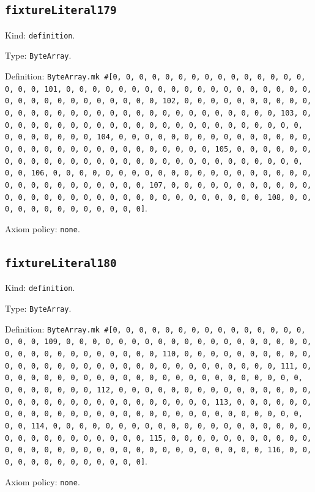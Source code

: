 \documentclass[11pt]{article}
\begin{document}
\subsection*{\texttt{fixtureLiteral179}}
\noindent Kind: \texttt{definition}.\par
\noindent Type: \texttt{ByteArray}.\par
\noindent Definition: \texttt{ByteArray.mk \#[0, 0, 0, 0, 0, 0, 0, 0, 0, 0, 0, 0, 0, 0, 0, 0, 0, 0, 101, 0, 0, 0, 0, 0, 0, 0, 0, 0, 0, 0, 0, 0, 0, 0, 0, 0, 0, 0, 0, 0, 0, 0, 0, 0, 0, 0, 0, 0, 0, 0, 102, 0, 0, 0, 0, 0, 0, 0, 0, 0, 0, 0, 0, 0, 0, 0, 0, 0, 0, 0, 0, 0, 0, 0, 0, 0, 0, 0, 0, 0, 0, 0, 103, 0, 0, 0, 0, 0, 0, 0, 0, 0, 0, 0, 0, 0, 0, 0, 0, 0, 0, 0, 0, 0, 0, 0, 0, 0, 0, 0, 0, 0, 0, 0, 104, 0, 0, 0, 0, 0, 0, 0, 0, 0, 0, 0, 0, 0, 0, 0, 0, 0, 0, 0, 0, 0, 0, 0, 0, 0, 0, 0, 0, 0, 0, 0, 105, 0, 0, 0, 0, 0, 0, 0, 0, 0, 0, 0, 0, 0, 0, 0, 0, 0, 0, 0, 0, 0, 0, 0, 0, 0, 0, 0, 0, 0, 0, 0, 106, 0, 0, 0, 0, 0, 0, 0, 0, 0, 0, 0, 0, 0, 0, 0, 0, 0, 0, 0, 0, 0, 0, 0, 0, 0, 0, 0, 0, 0, 0, 0, 107, 0, 0, 0, 0, 0, 0, 0, 0, 0, 0, 0, 0, 0, 0, 0, 0, 0, 0, 0, 0, 0, 0, 0, 0, 0, 0, 0, 0, 0, 0, 0, 108, 0, 0, 0, 0, 0, 0, 0, 0, 0, 0, 0, 0, 0]}.\par
\noindent Axiom policy: \texttt{none}.\par
\subsection*{\texttt{fixtureLiteral180}}
\noindent Kind: \texttt{definition}.\par
\noindent Type: \texttt{ByteArray}.\par
\noindent Definition: \texttt{ByteArray.mk \#[0, 0, 0, 0, 0, 0, 0, 0, 0, 0, 0, 0, 0, 0, 0, 0, 0, 0, 109, 0, 0, 0, 0, 0, 0, 0, 0, 0, 0, 0, 0, 0, 0, 0, 0, 0, 0, 0, 0, 0, 0, 0, 0, 0, 0, 0, 0, 0, 0, 0, 110, 0, 0, 0, 0, 0, 0, 0, 0, 0, 0, 0, 0, 0, 0, 0, 0, 0, 0, 0, 0, 0, 0, 0, 0, 0, 0, 0, 0, 0, 0, 0, 111, 0, 0, 0, 0, 0, 0, 0, 0, 0, 0, 0, 0, 0, 0, 0, 0, 0, 0, 0, 0, 0, 0, 0, 0, 0, 0, 0, 0, 0, 0, 0, 112, 0, 0, 0, 0, 0, 0, 0, 0, 0, 0, 0, 0, 0, 0, 0, 0, 0, 0, 0, 0, 0, 0, 0, 0, 0, 0, 0, 0, 0, 0, 0, 113, 0, 0, 0, 0, 0, 0, 0, 0, 0, 0, 0, 0, 0, 0, 0, 0, 0, 0, 0, 0, 0, 0, 0, 0, 0, 0, 0, 0, 0, 0, 0, 114, 0, 0, 0, 0, 0, 0, 0, 0, 0, 0, 0, 0, 0, 0, 0, 0, 0, 0, 0, 0, 0, 0, 0, 0, 0, 0, 0, 0, 0, 0, 0, 115, 0, 0, 0, 0, 0, 0, 0, 0, 0, 0, 0, 0, 0, 0, 0, 0, 0, 0, 0, 0, 0, 0, 0, 0, 0, 0, 0, 0, 0, 0, 0, 116, 0, 0, 0, 0, 0, 0, 0, 0, 0, 0, 0, 0, 0]}.\par
\noindent Axiom policy: \texttt{none}.\par
\end{document}
